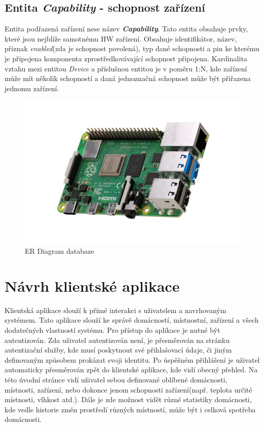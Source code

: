 \subsection*{Entita \emph{Capability} - schopnost zařízení}
\label{databaze:capability}
Entita podřazená zařízení nese název \textbf{\emph{Capability}}. Tato entita obsahuje prvky, které jsou nejblíže samotnému HW zařízení.
Obsahuje identifikátor, název, příznak \emph{enabled}(zda je schopnost povolená), typ dané schopnosti a pin ke kterému je připojena komponenta zprostředkovávající schopnost připojena.
Kardinalita vztahu mezi entitou \emph{Device} a příslušnou entitou je v poměru 1:N, kde zařízení může mít několik schopností a daná jednoznačná schopnost může být přiřazena jednomu zařízení.

\begin{figure}[hbt]
  \centering
  \includegraphics[width=1 \linewidth]{obrazky-figures/raspberry.png}
  \caption{ER Diagram databaze}
  \label{figure:er_databaze}
\end{figure}

\newpage
\section{Návrh klientské aplikace}
\label{navrh:frontend}

Klientská aplikace slouží k přímé interakci s uživatelem a navrhovaným systémem.
Tato aplikace slouží ke správě domácností, místnostní, zařízení a všech dodatečných vlastností systému.
Pro přístup do aplikace je nutné být autentizován.
Zda uživatel autentizován není, je přesměrován na stránku autentizační služby, kde musí poskytnout své přihlašovací údaje, či jiným definovaným způsobem prokázat svoji identitu.
Po úspěšném přihlášení je uživatel automaticky přesměrován zpět do klientské aplikace, kde vidí obecný přehled.
Na této úvodní stránce vidí uživatel sebou definované oblíbené domácnosti, místnosti, zařízení, nebo dokonce jenom schopnosti zařízení(např. teplota určité místnosti, vlhkost atd.).
Dále je zde možnost vidět různé statistiky domácnosti, kde vedle historie změn prostředí různých místností, může být i celková spotřeba domácnosti.

